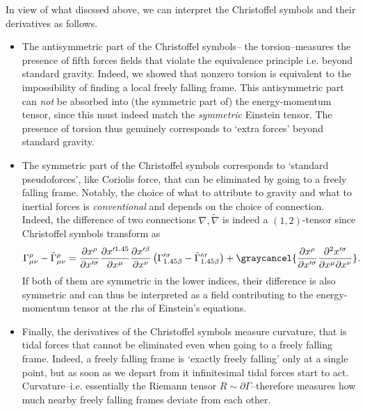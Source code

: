 \begin{mytheorem}
In view of what discssed above, we can interpret the Christoffel symbols and their derivatives as follows.
\begin{itemize}
    \item The antisymmetric part of the Christoffel symbols-- the torsion--measures the presence of fifth forces fields that violate the equivalence principle i.e. beyond standard gravity.
    Indeed, we showed that nonzero torsion is equivalent to the impossibility of finding a local freely falling frame.
    This antisymmetric part can \emph{not} be absorbed into (the symmetric part of) the energy-momentum tensor, since this must indeed match the \emph{symmetric} Einstein tensor.
    The presence of torsion thus genuinely corresponds to `extra forces' beyond standard gravity.
    \item The symmetric part of the Christoffel symbols corresponds to `standard pseudoforces', like Coriolis force, that can be eliminated by going to a freely falling frame.
    Notably, the choice of what to attribute to gravity and what to inertial forces is \emph{conventional} and depends on the choice of connection.
    Indeed, the difference of two connections $\nabla,\tilde{\nabla}$ is indeed a $(1,2)$-tensor since Christoffel symbols transform as
    \begin{align}\label{eq:difference_connection_is_tensor}
        \Gamma^{\rho}_{\mu \nu}- \tilde{\Gamma}^{\rho}_{\mu \nu} = \frac{\partial x^{\rho}}{\partial x^{\prime \sigma}} \frac{\partial x^{\prime \alpha}}{\partial x^{\mu}} \frac{\partial x^{\prime \beta}}{\partial x^{\nu}} \left(\Gamma^{\prime \sigma}_{\alpha \beta}-\tilde{\Gamma}^{\prime \sigma}_{\alpha \beta}\right) + \graycancel{ \frac{\partial x^{\rho}}{\partial x^{\prime \sigma}} \frac{\partial^2 x^{\prime \sigma}}{\partial x^{\mu} \partial x^{\nu}}}.
    \end{align}
    If both of them are symmetric in the lower indices, their difference is also symmetric and can thus be interpreted as a field contributing to the energy-momentum tensor at the rhs of Einstein's equations.
    \item Finally, the derivatives of the Christoffel symbols measure curvature, that is tidal forces that cannot be eliminated even when going to a freely falling frame.
    Indeed, a freely falling frame is `exactly freely falling' only at a single point, but as soon as we depart from it infinitesimal tidal forces start to act.
    Curvature--i.e. essentially the Riemann tensor $R\sim \partial \Gamma$--therefore measures how much nearby freely falling frames deviate from each other.
\end{itemize}
\end{mytheorem}


